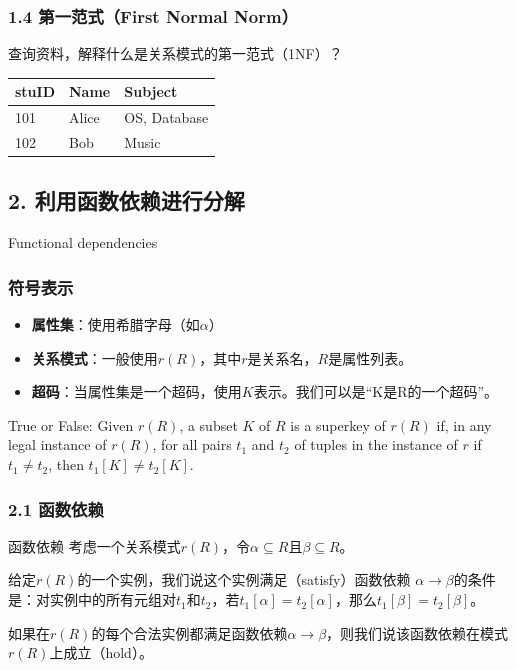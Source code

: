 \documentclass[aspectratio=169, 14pt]{beamer}
\begin{document}
\begin{frame}
	\frametitle{1.4 第一范式（First Normal Norm）}

	查询资料，解释什么是关系模式的\alert{第一范式}（1NF）？

	\begin{table}
		\begin{tabular}{lll}
			\toprule
			stuID & Name  & Subject      \\
			\midrule
			101   & Alice & OS, Database \\
			102   & Bob   & Music        \\
			\bottomrule
		\end{tabular}
	\end{table}


\end{frame}

\begin{frame}
	\section{\textcolor{darkmidnightblue}{2. 利用函数依赖进行分解}}
	Functional dependencies
\end{frame}

\begin{frame}
	\frametitle{符号表示}
	\begin{itemize}
		\item \textbf{属性集}：使用希腊字母（如$\alpha$）
		\item \textbf{关系模式}：一般使用$r(R)$，其中$r$是关系名，$R$是属性列表。
		\item \textbf{超码}：当属性集是一个超码，使用$K$表示。我们可以是“K是R的一个超码”。
	\end{itemize}

	True or False: Given $r(R)$, a subset $K$ of $R$ is a superkey of $r(R)$ if, in any legal instance of $r(R)$, for all pairs $t_1$ and $t_2$ of tuples in the instance of $r$ if $t_1 \neq t_2$, then $t_1[K] \neq t_2[K]$.


\end{frame}

\begin{frame}
	\frametitle{2.1 函数依赖}
	\begin{exampleblock}{函数依赖}
		考虑一个关系模式$r(R)$，令$\alpha \subseteq R$且$\beta \subseteq R$。

		给定$r(R)$的一个实例，我们说这个实例满足（satisfy）\alert{函数依赖} $\alpha \rightarrow \beta$的条件是：对实例中的所有元组对$t_1$和$t_2$，若$t_1[\alpha] = t_2[\alpha]$，那么$t_1[\beta] = t_2[\beta]$。
	\end{exampleblock}

	如果在$r(R)$的每个合法实例都满足函数依赖$\alpha \rightarrow \beta$，则我们说该函数依赖在模式$r(R)$上成立（hold）。
\end{frame}
\end{document}
